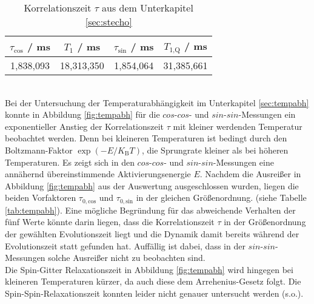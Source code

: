 \begin{table}
  \centering
  \caption{Korrelationszeit $\tau$ aus dem Unterkapitel \ref{sec:stecho}}
  \label{tab:tau}
  \begin{tabular}{S S S S}
    \toprule
    {$\tau_{\text{cos}}$ / ms} & {$T_1$ / ms} & {$\tau_{\text{sin}}$ / ms} & {$T_{1\text{,Q}}$ / ms}\\
    \midrule
    {1,838,093} & {18,313,350} & {1,854,064} & {31,385,661}\\
    \bottomrule
  \end{tabular}
\end{table}
\noindent
\\
Bei der Untersuchung der Temperaturabhängigkeit im Unterkapitel \ref{sec:tempabh}
konnte in Abbildung \ref{fig:tempabh} für die $cos$-$cos$- und $sin$-$sin$-Messungen
ein exponentieller Anstieg der Korrelationszeit $\tau$ mit kleiner werdenden Temperatur
beobachtet werden. Denn bei kleineren Temperaturen ist bedingt durch den
Boltzmann-Faktor $\exp{(-E/K_{\text{B}}T)}$, die Sprungrate kleiner als bei
höheren Temperaturen. Es zeigt sich in den $cos$-$cos$- und $sin$-$sin$-Messungen
eine annähernd übereinstimmende Aktivierungsenergie $E$.
Nachdem die Ausreißer in Abbildung \ref{fig:tempabh} aus der Auswertung ausgeschlossen
wurden, liegen die beiden Vorfaktoren $\tau_{0,\text{cos}}$ und $\tau_{0,\text{sin}}$
in der gleichen Größenordnung. (siehe Tabelle \ref{tab:tempabh}).
Eine mögliche Begründung für das abweichende Verhalten der fünf Werte könnte darin liegen,
dass die Korrelationszeit $\tau$ in der Größenordnung der gewählten Evolutionszeit
liegt und die Dynamik damit bereits während der Evolutionszeit statt gefunden hat.
Auffällig ist dabei, dass in der $sin$-$sin$-Messungen solche Ausreißer nicht zu
beobachten sind.\\
Die Spin-Gitter Relaxationszeit in Abbildung \ref{fig:tempabh} wird hingegen bei
kleineren Temperaturen kürzer, da auch diese dem Arrehenius-Gesetz folgt. Die
Spin-Spin-Relaxationszeit konnten leider nicht genauer untersucht werden (s.o.).


